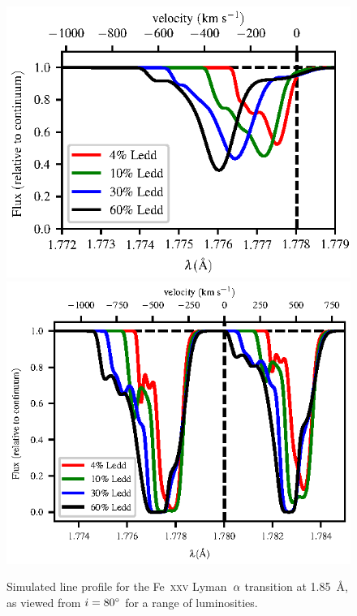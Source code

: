 \documentclass[a4paper,fleqn,usenatbib]{mnras}
\begin{document}
\begin{figure}
\includegraphics[width=\columnwidth]{figures/60_degrees_fe26.eps}
\includegraphics[width=\columnwidth]{figures/80_degrees_fe26.eps}
\caption{Simulated line profile for the Fe~\textsc{xxv} Lyman~$\rm{\alpha}$
transition at 1.85~{\AA}, as viewed from $i = 80\degree$ for a range
of luminosities.}
\label{figure:line25}
\end{figure}



\end{document}
